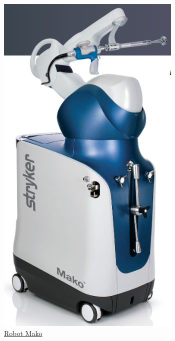 \begin{figure}[ht!]
\begin{minipage}{0.15\linewidth}
		\includegraphics[width=\linewidth]{figs/mako.png}
		\caption*{\centering\href{https://www.stryker.com/content/dam/stryker/joint-replacement/systems/mako-system-overview/resources}{Robot Mako}}
	\end{minipage}
    \hspace{3cm}
    \begin{minipage}{0.2\linewidth}

\end{minipage}
\end{figure}
